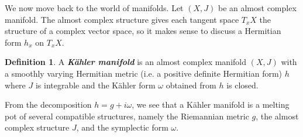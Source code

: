\documentclass[psamsfonts, 12pt]{amsart}
\theoremstyle{definition}
\newtheorem{defn}[thm]{Definition}
\theoremstyle{remark}
\newcommand{\ib}[1]{\textbf{\textit{#1}}}
\begin{document}
%
We now move back to the world of manifolds. Let $(X,J)$ be an almost complex manifold.
The almost complex structure gives each tangent space $T_xX$ the structure of a complex
vector space, so it makes sense to discuss a Hermitian form $h_x$ on $T_xX$.
%
\begin{defn}
A \ib{K\"ahler manifold} is an almost complex manifold $(X,J)$ with a smoothly varying
Hermitian metric (i.e. a positive definite Hermitian form) $h$ where $J$ is integrable
and the K\"ahler form $\omega$ obtained from $h$ is closed.
\end{defn}
%
From the decomposition $h = g + i\omega$, we see that a K\"ahler manifold is a
melting pot of several compatible structures, namely the Riemannian metric $g$, the
almost complex structure $J$, and the symplectic form $\omega$. \\
\end{document}
